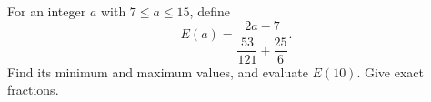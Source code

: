 For an integer $a$ with $7\le a\le15$, define
\[
E(a)=\dfrac{2a-7}{\dfrac{53}{121}+\dfrac{25}{6}}.
\]
Find its minimum and maximum values, and evaluate $E(10)$. Give exact fractions.
